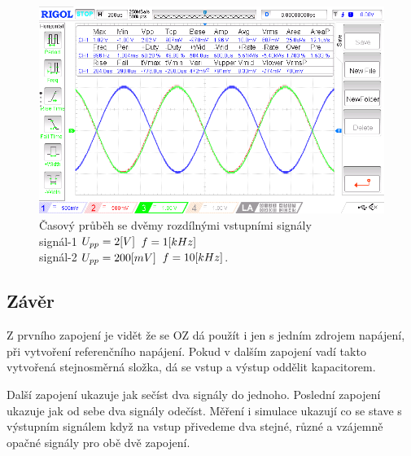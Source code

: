 \documentclass{article}
\begin{document}
\begin{figure}[H]
  \begin{minipage}[t]{\textwidth}
    \centering
    \includegraphics[width=\textwidth]{LAB/NewFile9.png}
    Časový průběh se dvěmy rozdílnými vstupními signály \\
    signál-1 \(U_{pp} = 2\-[V]\) \(f = 1\-[kHz]\) \\
    signál-2 \(U_{pp} = 200\-[mV]\) \(f = 10\-[kHz]\).
  \end{minipage}
\end{figure}

\vspace{-3mm}
\subsection{Závěr}

Z prvního zapojení je vidět že se OZ dá použít i jen s jedním zdrojem napájení, při vytvoření referenčního napájení.
Pokud v dalším zapojení vadí takto vytvořená stejnosměrná složka, dá se vstup a výstup oddělit kapacitorem.

Další zapojení ukazuje jak sečíst dva signály do jednoho.
Poslední zapojení ukazuje jak od sebe dva signály odečíst.
Měření i simulace ukazují co se stave s výstupním signálem když na vstup přivedeme dva stejné, různé a vzájemně opačné signály pro obě dvě zapojení.
\end{document}
